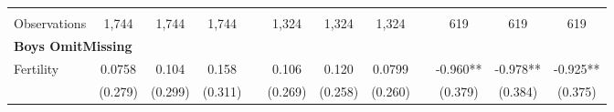 \begin{landscape}
\begin{table}[htpb!]
\begin{center}
\begin{tabular}{lcccp{2mm}cccp{2mm}ccc}
\begin{footnotesize}\end{footnotesize}&\begin{footnotesize}\end{footnotesize}&\begin{footnotesize}\end{footnotesize}&\begin{footnotesize}\end{footnotesize}&\begin{footnotesize}\end{footnotesize}&\begin{footnotesize}\end{footnotesize}&\begin{footnotesize}\end{footnotesize}&\begin{footnotesize}\end{footnotesize}&\begin{footnotesize}\end{footnotesize}&\begin{footnotesize}\end{footnotesize}&\begin{footnotesize}\end{footnotesize}&\begin{footnotesize}\end{footnotesize}\\Observations&1,744&1,744&1,744&&1,324&1,324&1,324&&619&619&619\\
\multicolumn{12}{l}{\textbf{Boys OmitMissing}}\\ 
Fertility&0.0758&0.104&0.158&&0.106&0.120&0.0799&&-0.960**&-0.978**&-0.925**\\
&(0.279)&(0.299)&(0.311)&&(0.269)&(0.258)&(0.260)&&(0.379)&(0.384)&(0.375)\\

\end{tabular}
\end{center}
\end{table}
\end{landscape}
